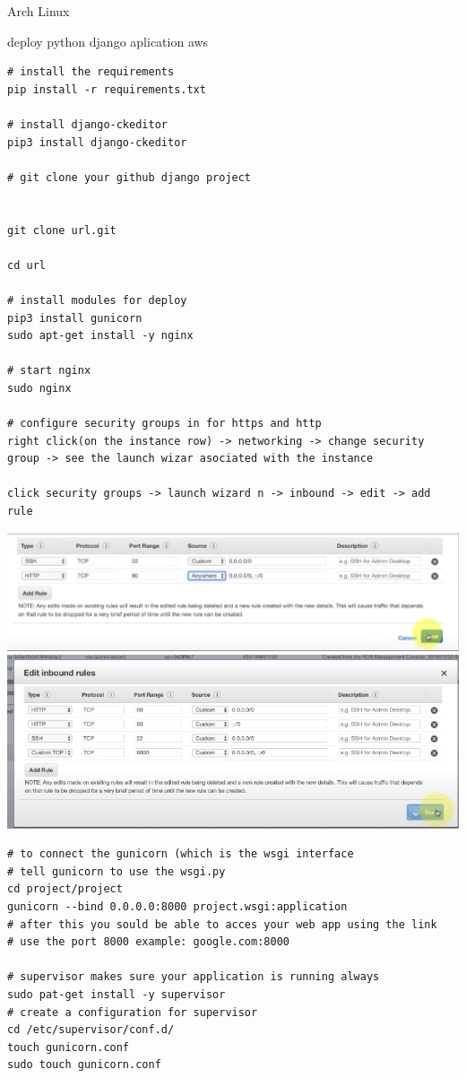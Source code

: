 \begin{section}{Arch Linux}
\begin{subsection}{deploy python django aplication aws}
\begin{verbatim}
# install the requirements
pip install -r requirements.txt

# install django-ckeditor
pip3 install django-ckeditor

# git clone your github django project


git clone url.git

cd url

# install modules for deploy
pip3 install gunicorn
sudo apt-get install -y nginx

# start nginx
sudo nginx

# configure security groups in for https and http
right click(on the instance row) -> networking -> change security group -> see the launch wizar asociated with the instance

click security groups -> launch wizard n -> inbound -> edit -> add rule 

\end{verbatim}

\includegraphics{img_ArchLinux/inboundRules.png}
\includegraphics{img_ArchLinux/inboudUpdate.png}

\begin{verbatim}
# to connect the gunicorn (which is the wsgi interface 
# tell gunicorn to use the wsgi.py
cd project/project
gunicorn --bind 0.0.0.0:8000 project.wsgi:application
# after this you sould be able to acces your web app using the link
# use the port 8000 example: google.com:8000

# supervisor makes sure your application is running always
sudo pat-get install -y supervisor
# create a configuration for supervisor
cd /etc/supervisor/conf.d/
touch gunicorn.conf
sudo touch gunicorn.conf


\end{verbatim}
\end{subsection}
\end{section}
